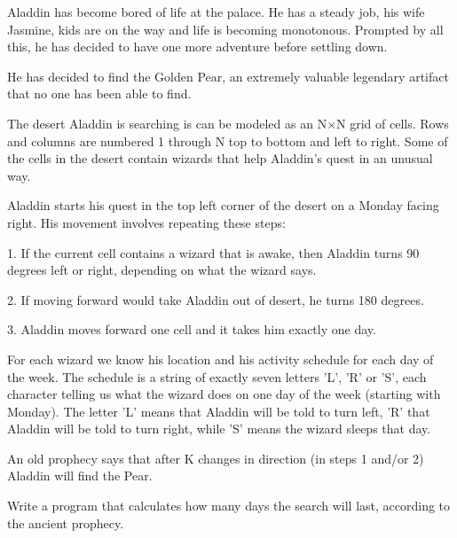 Aladdin has become bored of life at the palace. He has a steady job, his wife Jasmine, kids are on the way and life is becoming monotonous. Prompted by all this, he has decided to have one more adventure before settling down.  

   He has decided to find the Golden Pear, an extremely valuable legendary artifact that no one has been able to find.  

   The desert Aladdin is searching is can be modeled as an N×N grid of cells. Rows and columns are numbered 1 through N top to bottom and left to right. Some of the cells in the desert contain wizards that help Aladdin's quest in an unusual way.  

   Aladdin starts his quest in the top left corner of the desert on a Monday facing right. His movement involves repeating these steps:  
\begin{itemize}

    1. If the current cell contains a wizard that is awake, then Aladdin turns 90 degrees left or right, depending on what the wizard says.   

    2. If moving forward would take Aladdin out of desert, he turns 180 degrees.   

    3. Aladdin moves forward one cell and it takes him exactly one day.   
\end{itemize}

   For each wizard we know his location and his activity schedule for each day of the week. The schedule is a string of exactly seven letters 'L', 'R' or 'S', each character telling us what the wizard does on one day of the week (starting with Monday). The letter 'L' means that Aladdin will be told to turn left, 'R' that Aladdin will be told to turn right, while 'S' means the wizard sleeps that day.  

   An old prophecy says that after K changes in direction (in steps 1 and/or 2) Aladdin will find the Pear.  

   Write a program that calculates how many days the search will last, according to the ancient prophecy.  

\